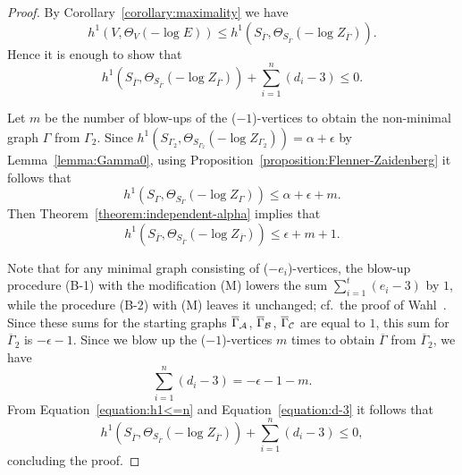 \documentclass[a4paper, reqno, twoside]{amsart}
\theoremstyle{definition}
\numberwithin{equation}{section}
\begin{document}
\begin{proof}
By Corollary~\ref{corollary:maximality} we have
\[h^1(V, \Theta_{V}(-\log{E})) \le
h^1(S_{\overline{\Gamma}},
\Theta_{S_{\overline{\Gamma}}}(-\log{Z_{\overline{\Gamma}}})).\]
Hence it is enough to show that
\begin{equation*}
h^1(S_{\overline{\Gamma}}, \Theta_{S_{\overline{\Gamma}}}(-\log{Z_{\overline{\Gamma}}})) + \sum_{i=1}^{n} (d_i-3) \le 0.
\end{equation*}

Let $m$ be the number of blow-ups of the ($-1$)-vertices to obtain the
non-minimal graph $\Gamma$ from $\Gamma_2$. Since $h^1(S_{\Gamma_2},
\Theta_{S_{\Gamma_2}}(-\log{Z_{\Gamma_2}})) = \alpha + \epsilon$ by
Lemma~\ref{lemma:Gamma0},
using Proposition~\ref{proposition:Flenner-Zaidenberg} it follows that
\begin{equation*}
h^1(S_{\Gamma}, \Theta_{S_{\Gamma}}(-\log{Z_{\Gamma}})) \le \alpha + \epsilon + m.
\end{equation*}
Then Theorem~\ref{theorem:independent-alpha}  implies that
\begin{equation}\label{equation:h1<=n}
h^1(S_{\overline{\Gamma}},
\Theta_{S_{\overline{\Gamma}}}(-\log{Z_{\overline{\Gamma}}})) \le \epsilon + m + 1.
\end{equation}

Note that for any minimal graph consisting of ($-e_i$)-vertices, the
blow-up procedure (B-1) with the modification (M) lowers the sum $\sum_{i=1}^{t} (e_i-3)$ by
$1$, while the procedure (B-2) with (M) leaves it unchanged; cf.\  the
proof of Wahl~\cite[Theorem~8.6]{Wahl-2011}. Since these sums for the
starting graphs $\overline{\Gamma}_{\ensuremath \mathcal{A}}$,
$\overline{\Gamma}_{\ensuremath \mathcal{B}}$, $\overline{\Gamma}_{\ensuremath \mathcal{C}}$ are equal to $1$,
this sum for $\overline{\Gamma}_2$ is $-\epsilon-1$. Since we blow up the ($-1$)-vertices $m$ times to obtain $\overline{\Gamma}$ from
$\overline{\Gamma}_2$, we have
\begin{equation}\label{equation:d-3}
\sum_{i=1}^{n} (d_i-3) = -\epsilon-1-m.
\end{equation}
From Equation~\eqref{equation:h1<=n} and Equation~\eqref{equation:d-3}
it follows that
\begin{equation*}
h^1(S_{\overline{\Gamma}},
\Theta_{S_{\overline{\Gamma}}}(-\log{Z_{\overline{\Gamma}}})) +
\sum_{i=1}^{n} (d_i-3) \le 0,
\end{equation*}
concluding the proof.
\end{proof}
\end{document}
